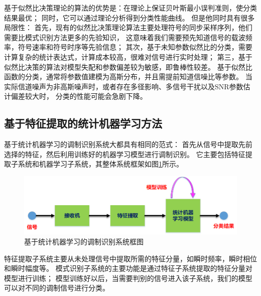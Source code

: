 基于似然比决策理论的算法的优势是：在理论上保证贝叶斯最小误判准则，使分类结果最优；
同时，它可以通过理论分析得到分类性能曲线。
但是他同时具有很多局限性：
首先，现有的似然比决策理论算法主要处理符号的同步采样序列，他们需要比模式识别方法更多的先验知识，
这意味着我们需要预先知道信号的载波频率，符号速率和符号时序等先验信息；
其次，基于未知参数似然比的分类，需要计算复杂的统计表达式，计算成本较高，很难对信号进行实时处理；
第三，基于似然比决策的算法对模型失配和参数偏差较为敏感，即鲁棒性较差。
基于似然比函数的分类，通常将参数值建模为高斯分布，并且需提前知道信噪比等参数。
当实际信道噪声为非高斯噪声时，或者存在多径影响、多信号干扰以及SNR参数估计偏差较大时，
分类的性能可能会急剧下降。\par
 
\subsection{基于特征提取的统计机器学习方法}

基于统计机器学习的调制识别系统大都具有相同的范式：
首先从信号中提取先前选择的特征，然后利用训练好的机器学习模型进行调制识别。
它主要包括特征提取子系统和机器学习子系统，其整体系统框架如图\ref{sec:fig_1_1}所示。\par

\begin{figure}
	\centering
	\includegraphics[scale=0.6]{figures/chapter_1/fig_1_1}
	\caption{基于统计机器学习的调制识别系统框图} \label{sec:fig_1_1}
\end{figure}

特征提取子系统主要从未处理信号中提取所需的特征分量，如瞬时频率，瞬时相位和瞬时幅度等。 
模式识别子系统的主要功能是通过特征子系统提取的特征分量对模型进行训练；
模型训练好以后，当需要判别的信号进入该子系统，我们的模型可以对不同的调制信号进行分类。\par

